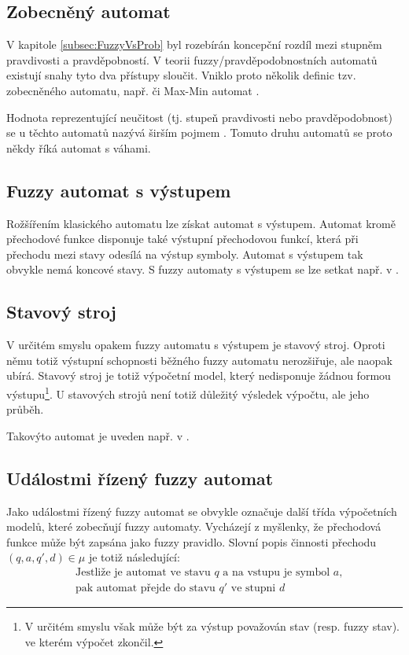 \documentclass[a4paper,10pt]{article}
\begin{document}
\subsection{Zobecněný automat}
V kapitole \ref{subsec:FuzzyVsProb} byl rozebírán koncepční rozdíl mezi stupněm pravdivosti a pravděpobností. V teorii fuzzy/pravděpodobnostních automatů existují snahy tyto dva přístupy sloučit. Vniklo proto několik definic tzv. zobecněného automatu, např. \cite{DooKre-NewDirFuzzAut} či Max-Min automat \cite{San-MaxAut}. 

Hodnota reprezentující neučitost (tj. stupeň pravdivosti nebo pravděpodobnost) se u těchto automatů nazývá širším pojmem . Tomuto druhu automatů se proto někdy říká automat s váhami.

\subsection{Fuzzy automat s výstupem}
Rožšířením klasického automatu lze získat automat s výstupem. Automat kromě přechodové funkce disponuje také výstupní přechodovou funkcí, která při přechodu mezi stavy odesílá na výstup symboly. Automat s výstupem tak obvykle nemá koncové stavy. S fuzzy automaty s výstupem se lze setkat např. v \cite{BlaDelPeg-FuzzAutIndUsNeuNet}\cite{PedGac-LeaFuzzAut}\cite{BlaDelPeg-FuzzGraIntUsiNeuNet}\cite{CheMo-MinAlgFuzFinAut}\cite{ThoMar-DetAccRegFuzLang}.

\subsection{Stavový stroj}
V určitém smyslu opakem fuzzy automatu s výstupem je stavový stroj. Oproti němu totiž výstupní schopnosti běžného fuzzy automatu nerozšiřuje, ale naopak ubírá. Stavový stroj je totiž výpočetní model, který nedisponuje žádnou formou výstupu\footnote{V určitém smyslu však může být za výstup považován stav (resp. fuzzy stav). ve kterém výpočet zkončil.}. U stavových strojů není totiž důležitý výsledek výpočtu, ale jeho průběh.

Takovýto automat je uveden např. v \cite{Qiu-ChaFuzFinAut}.

\subsection{Událostmi řízený fuzzy automat} \label{subsec:FuzzEvMach}
Jako událostmi řízený fuzzy automat se obvykle označuje další třída výpočetních modelů, které zobecňují fuzzy automaty. Vycházejí z myšlenky, že přechodová funkce může být zapsána jako fuzzy \ifthen pravidlo. Slovní popis činnosti přechodu $(q, a, q', d) \in \mu$ je totiž následující:
\begin{align*}
 &\text{Jestliže je automat ve stavu $q$ a na vstupu je symbol $a$,} \\
 &\text{pak automat přejde do stavu $q'$ ve stupni $d$ }
\end{align*}
\end{document}
